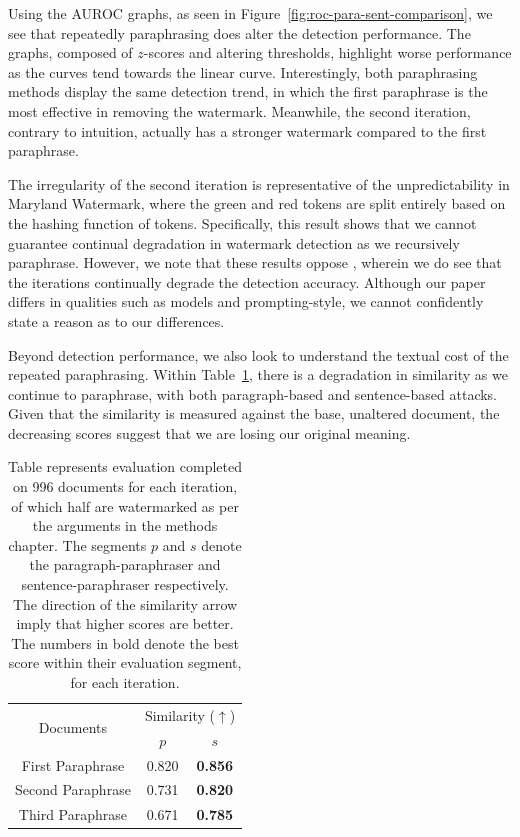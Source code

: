 \documentclass{l4proj}
\theoremstyle{definition}
\begin{document}
    Using the AUROC graphs, as seen in Figure~\ref{fig:roc-para-sent-comparison}, we see that repeatedly paraphrasing does alter the detection performance. The graphs, composed of $z$-scores and altering thresholds, highlight worse performance as the curves tend towards the linear curve. Interestingly, both paraphrasing methods display the same detection trend, in which the first paraphrase is the most effective in removing the watermark. Meanwhile, the second iteration, contrary to intuition, actually has a stronger watermark compared to the first paraphrase.

    The irregularity of the second iteration is representative of the unpredictability in Maryland Watermark, where the green and red tokens are split entirely based on the hashing function of tokens. Specifically, this result shows that we cannot guarantee continual degradation in watermark detection as we recursively paraphrase. However, we note that these results oppose \citet{sadasivan2023aigenerated}, wherein we do see that the iterations continually degrade the detection accuracy. Although our paper differs in qualities such as models and prompting-style, we cannot confidently state a reason as to our differences.

    Beyond detection performance, we also look to understand the textual cost of the repeated paraphrasing. Within Table~\ref{table:recursive-paraphrase-table}, there is a degradation in similarity as we continue to paraphrase, with both paragraph-based and sentence-based attacks. Given that the similarity is measured against the base, unaltered document, the decreasing scores suggest that we are losing our original meaning.

    \begin{table}[ht]
        \centering
        \begin{tabular}{c|cc}
        \multirow{2}{*}{Documents}  & \multicolumn{2}{c}{Similarity ($\uparrow$)} \\ \cline{2-3} 
        & \multicolumn{1}{c|}{$p$} & $s$ \\ \hline
        First Paraphrase & 0.820 & \textbf{0.856} \\
        Second Paraphrase & 0.731 & \textbf{0.820} \\
        Third Paraphrase & 0.671 & \textbf{0.785} 
        \end{tabular}
        \caption{Table represents evaluation completed on 996 documents for each iteration, of which half are watermarked as per the arguments in the methods chapter. The segments $p$ and $s$ denote the paragraph-paraphraser and sentence-paraphraser respectively. The direction of the similarity arrow imply that higher scores are better. The numbers in bold denote the best score within their evaluation segment, for each iteration.}
        \label{table:recursive-paraphrase-table}
    \end{table}
\end{document}
